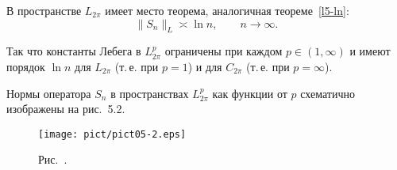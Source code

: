 В пространстве {$L_{2\pi}$} имеет место теорема, аналогичная {теореме~\ref{l5-ln}}:
$$ \|{S}_n\|_L \asymp \ln n,\qquad n\to \infty.$$

Так что константы Лебега в {$L^p_{2\pi}$} ограничены при каждом
$p\in (1,\infty)$ и имеют порядок $\ln n$ для {$L_{2\pi}$} (т.\,е. при
$p=1$) и для {$C_{2\pi}$} (т.\,е. при $p=\infty$).

Нормы оператора $S_n$  в пространствах $L^p_{2\pi}$ как
функции от $p$ схематично изображены на рис.~5.2.

\begin{figure}[ht]
\begin{center}
\texttt{[image: pict/pict05-2.eps]}
\end{center}
 \bigskip
 \label{r5-2}

 \centerline{Рис.~\theris. }
 \bigskip
\end{figure}




